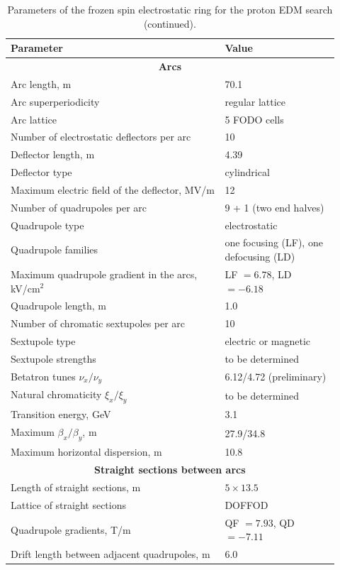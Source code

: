 \begin{table}[!htbp]
  \caption{Parameters of the frozen spin electrostatic ring for the proton
    EDM search (continued).}
  \label{tab:pring-cont}
  \centering
  \renewcommand{\baselinestretch}{1}\small\selectfont
  \begin{tabular}{@{}p{0.60\linewidth}@{\hspace{1em}}p{0.32\linewidth}@{}}
    \toprule
    Parameter & Value \\
    \midrule
    \multicolumn{2}{c}{\textbf{Arcs}} \\
    \midrule
    Arc length, m & 70.1 \\
    Arc superperiodicity & regular lattice \\
    Arc lattice & 5 FODO cells \\
    Number of electrostatic deflectors per arc & 10 \\
    Deflector length, m & 4.39 \\
    Deflector type & cylindrical \\
    Maximum electric field of the deflector, MV/m & 12 \\
    Number of quadrupoles per arc & 9 + 1 (two end halves) \\
    Quadrupole type & electrostatic \\
    Quadrupole families & one focusing (LF), one defocusing (LD) \\
    Maximum quadrupole gradient in the arcs, kV/cm$^2$
      & LF $= 6.78$, LD $= -6.18$ \\
    Quadrupole length, m & 1.0 \\
    Number of chromatic sextupoles per arc & 10 \\
    Sextupole type & electric or magnetic \\
    Sextupole strengths & to be determined \\
    Betatron tunes $\nu_x/\nu_y$ & 6.12/4.72 (preliminary) \\
    Natural chromaticity $\xi_x/\xi_y$ & to be determined \\
    Transition energy, GeV & 3.1 \\
    Maximum $\beta_x/\beta_y$, m & 27.9/34.8 \\
    Maximum horizontal dispersion, m & 10.8 \\
    \midrule
    \multicolumn{2}{c}{\textbf{Straight sections between arcs}} \\
    \midrule
    Length of straight sections, m & $5\times 13.5$ \\
    Lattice of straight sections & DOFFOD \\
    Quadrupole gradients, T/m & QF $= 7.93$, QD $= -7.11$ \\
    Drift length between adjacent quadrupoles, m & 6.0 \\
    \bottomrule
  \end{tabular}
\end{table}

